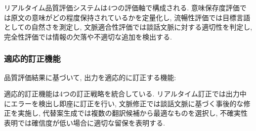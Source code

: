 リアルタイム品質評価システムは4つの評価軸で構成される.
意味保存度評価では原文の意味がどの程度保持されているかを定量化し, 流暢性評価では目標言語としての自然さを測定し, 文脈適合性評価では談話文脈に対する適切性を判定し, 完全性評価では情報の欠落や不適切な追加を検出する.

\subsubsection{適応的訂正機能}

品質評価結果に基づいて, 出力を適応的に訂正する機能:

適応的訂正機能は4つの訂正戦略を統合している.
リアルタイム訂正では出力中にエラーを検出し即座に訂正を行い, 文脈修正では談話文脈に基づく事後的な修正を実施し, 代替案生成では複数の翻訳候補から最適なものを選択し, 不確実性表明では確信度が低い場合に適切な留保を表明する.